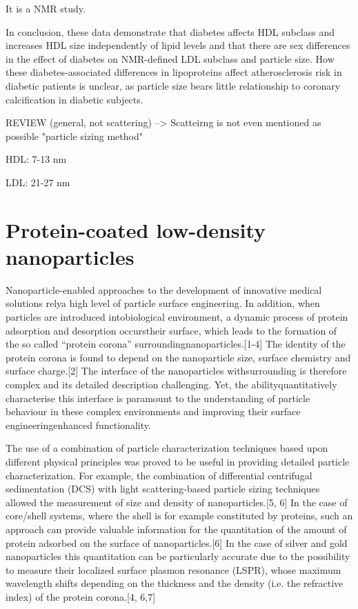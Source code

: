It is a NMR study.

In  conclusion,  these  data  demonstrate  that  diabetes affects  HDL  subclass  and  increases  HDL  size  independently of lipid levels and that there are sex differences in the  effect  of  diabetes  on  NMR-defined  LDL  subclass  and particle size. How these diabetes-associated differences in lipoproteins affect atherosclerosis risk in diabetic patients is  unclear,  as  particle  size  bears  little  relationship  to coronary  calcification  in  diabetic  subjects.

\cite{german_lipoproteins:_2006}

REVIEW (general, not scattering) --> Scatteirng is not even mentioned as possible "particle sizing method"

HDL: 7-13 nm

LDL: 21-27 nm



\section{Protein-coated low-density nanoparticles}
 Nanoparticle-enabled  approaches to the development of innovative medical solutions relya high level of particle surface engineering. In addition, when particles are introduced intobiological environment, a dynamic process of protein adsorption and desorption occurstheir surface, which leads to the formation of the so called “protein corona” surroundingnanoparticles.[1-4] The identity of the protein corona is found to depend on the nanoparticle size, surface chemistry and surface charge.[2] The interface of the nanoparticles withsurrounding is therefore complex and its detailed description challenging. Yet, the abilityquantitatively characterise this interface is paramount to the understanding of particle behaviour in these complex environments and improving their surface engineeringenhanced functionality.
 
The use of a combination of particle characterization techniques based upon different physical principles was proved to be useful in providing detailed particle characterization. For example, the combination of differential centrifugal sedimentation (DCS) with light scattering-based particle sizing techniques allowed the measurement of size and density of nanoparticles.[5, 6] In the case of core/shell systems, where the shell is for example constituted by proteins, such an approach can provide valuable information for the quantitation of the amount of protein adsorbed on the surface of nanoparticles.[6] In the case of silver and gold nanoparticles this quantitation can be particularly accurate due to the possibility to measure their localized surface plasmon resonance (LSPR), whose maximum wavelength shifts depending on the thickness and the density (i.e. the refractive index) of the protein corona.[4, 6,7]

